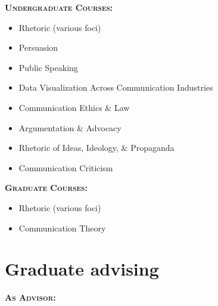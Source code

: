 \documentclass[10pt, a4paper]{article}
\begin{document}
\textbf{\textsc{Undergraduate Courses:}}

\noindent
\begin{itemize}[noitemsep]
    \item Rhetoric (various foci)
    \item Persuasion
    \item Public Speaking
    \item Data Visualization Across Communication Industries
    \item Communication Ethics \& Law
    \item Argumentation \& Advocacy
    \item Rhetoric of Ideas, Ideology, \& Propaganda
    \item Communication Criticism
\end{itemize}

\textbf{\textsc{Graduate Courses:}}

\noindent
\begin{itemize}[noitemsep]
    \item Rhetoric (various foci)
    \item Communication Theory
\end{itemize}



\section*{Graduate advising}

\textbf{\textsc{As Advisor:}}
\end{document}
